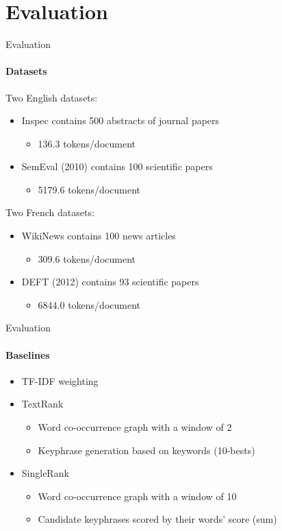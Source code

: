 \section{Evaluation}
  \begin{frame}{Evaluation}
    \framesubtitle{Datasets}

    Two English datasets:
    \begin{itemize}
      \item<2->{Inspec contains 500 abstracts of journal papers}
      \begin{itemize}
        \item{136.3 tokens/document}
      \end{itemize}
      \item<3->{SemEval (2010) contains 100 scientific papers}
      \begin{itemize}
        \item{5179.6 tokens/document}
      \end{itemize}
    \end{itemize}

    \vfill

    Two French datasets:
    \begin{itemize}
      \item<4->{WikiNews contains 100 news articles}
      \begin{itemize}
        \item{309.6 tokens/document}
      \end{itemize}
      \item<5->{DEFT (2012) contains 93 scientific papers}
      \begin{itemize}
        \item{6844.0 tokens/document}
      \end{itemize}
    \end{itemize}
  \end{frame}

  \begin{frame}{Evaluation}
    \framesubtitle{Baselines}

    \begin{itemize}
      \item<+->{TF-IDF weighting}
      \item<+->{TextRank}
      \begin{itemize}
        \item{Word co-occurrence graph with a window of 2}
        \item{Keyphrase generation based on keywords (10-bests)}
      \end{itemize}
      \item<+->{SingleRank}
      \begin{itemize}
        \item{Word co-occurrence graph with a window of 10}
        \item{Candidate keyphrases scored by their words' score (sum)}
      \end{itemize}
    \end{itemize}
  \end{frame}

